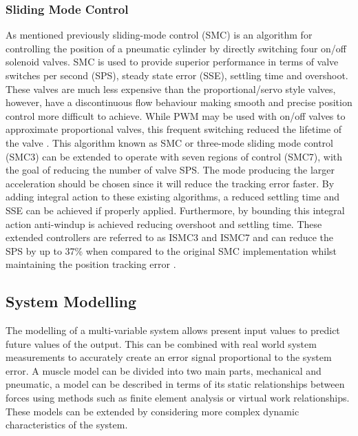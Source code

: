 \documentclass[11pt,a4paper]{article}
\begin{document}
\subsubsection{Sliding Mode Control}
\label{sub:sliding_mode_control}
As mentioned previously sliding-mode control (SMC) is an algorithm for controlling the position of a pneumatic cylinder by directly switching four on/off solenoid valves. SMC is used to provide superior performance in terms of valve switches per second (SPS), steady state error (SSE), settling time and overshoot. These valves are much less expensive than the proportional/servo style valves, however, have a discontinuous flow behaviour making smooth and precise position control more difficult to achieve. While PWM may be used with on/off valves to approximate proportional valves, this frequent switching reduced the lifetime of the valve \cite{zhang_bone_2018}. \newline
This algorithm known as SMC or three-mode sliding mode control (SMC3) can be extended to operate with seven regions of control (SMC7), with the goal of reducing the number of valve SPS. The mode producing the larger acceleration should be chosen since it will reduce the tracking error faster. By adding integral action to these existing algorithms, a reduced settling time and SSE can be achieved if properly applied. Furthermore, by bounding this integral action anti-windup is achieved reducing overshoot and settling time. These extended controllers are referred to as ISMC3 and ISMC7 and can reduce the SPS by up to 37\% when compared to the original SMC implementation whilst maintaining the position tracking error \cite{zhang_bone_2018}.

\subsection{System Modelling}
\label{sub:system_modelling}
The modelling of a multi-variable system allows present input values to predict future values of the output. This can be combined with real world system measurements to accurately create an error signal proportional to the system error. A muscle model can be divided into two main parts, mechanical and pneumatic, a model can be described in terms of its static relationships between forces using methods such as finite element analysis or virtual work relationships. These models can be extended by considering more complex dynamic characteristics of the system.
\end{document}
